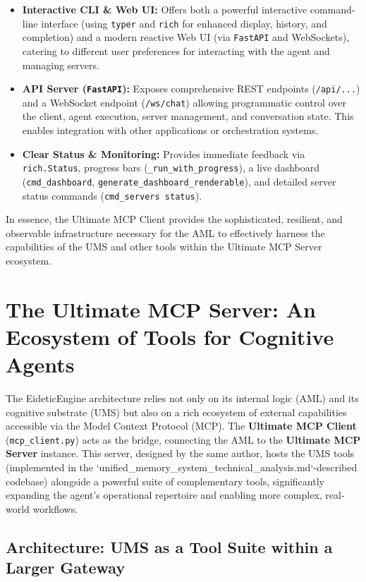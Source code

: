 \documentclass[12pt,a4paper]{article}
\newcommand{\code}[1]{\nolinkurl{#1}}
\begin{document}
\begin{itemize}
    \item \textbf{Interactive CLI \& Web UI:} Offers both a powerful interactive command-line interface (using \code{typer} and \code{rich} for enhanced display, history, and completion) and a modern reactive Web UI (via \code{FastAPI} and WebSockets), catering to different user preferences for interacting with the agent and managing servers.

    \item \textbf{API Server (\code{FastAPI}):} Exposes comprehensive REST endpoints (\code{/api/...}) and a WebSocket endpoint (\code{/ws/chat}) allowing programmatic control over the client, agent execution, server management, and conversation state. This enables integration with other applications or orchestration systems.

    \item \textbf{Clear Status \& Monitoring:} Provides immediate feedback via \code{rich.Status}, progress bars (\code{\_run\_with\_progress}), a live dashboard (\code{cmd\_dashboard}, \code{generate\_dashboard\_renderable}), and detailed server status commands (\code{cmd\_servers status}).
\end{itemize}

In essence, the Ultimate MCP Client provides the sophisticated, resilient, and observable infrastructure necessary for the AML to effectively harness the capabilities of the UMS and other tools within the Ultimate MCP Server ecosystem.

\section{The Ultimate MCP Server: An Ecosystem of Tools for Cognitive Agents}

The EideticEngine architecture relies not only on its internal logic (AML) and its cognitive substrate (UMS) but also on a rich ecosystem of external capabilities accessible via the Model Context Protocol (MCP). The \textbf{Ultimate MCP Client} (\code{mcp\_client.py}) acts as the bridge, connecting the AML to the \textbf{Ultimate MCP Server} instance. This server, designed by the same author, hosts the UMS tools (implemented in the `unified\_memory\_system\_technical\_analysis.md`-described codebase) alongside a powerful suite of complementary tools, significantly expanding the agent's operational repertoire and enabling more complex, real-world workflows.

\subsection{Architecture: UMS as a Tool Suite within a Larger Gateway}
\end{document}

